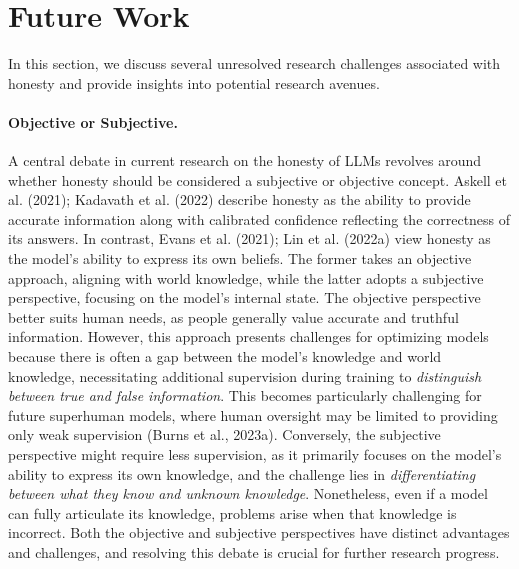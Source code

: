 \section{Future Work}
\label{sec:future}

In this section, we discuss several unresolved research challenges associated with honesty and provide insights into potential research avenues.

\paragraph{Objective or Subjective.} A central debate in current research on the honesty of LLMs revolves around whether honesty should be considered a subjective or objective concept. Askell et al. (2021); Kadavath et al. (2022) describe honesty as the ability to provide accurate information along with calibrated confidence reflecting the correctness of its answers. In contrast, Evans et al. (2021); Lin et al. (2022a) view honesty as the model's ability to express its own beliefs. The former takes an objective approach, aligning with world knowledge, while the latter adopts a subjective perspective, focusing on the model's internal state. The objective perspective better suits human needs, as people generally value accurate and truthful information. However, this approach presents challenges for optimizing models because there is often a gap between the model's knowledge and world knowledge, necessitating additional supervision during training to \emph{distinguish between true and false information}. This becomes particularly challenging for future superhuman models, where human oversight may be limited to providing only weak supervision (Burns et al., 2023a). Conversely, the subjective perspective might require less supervision, as it primarily focuses on the model's ability to express its own knowledge, and the challenge lies in \emph{differentiating between what they know and unknown knowledge}. Nonetheless, even if a model can fully articulate its knowledge, problems arise when that knowledge is incorrect. Both the objective and subjective perspectives have distinct advantages and challenges, and resolving this debate is crucial for further research progress.

